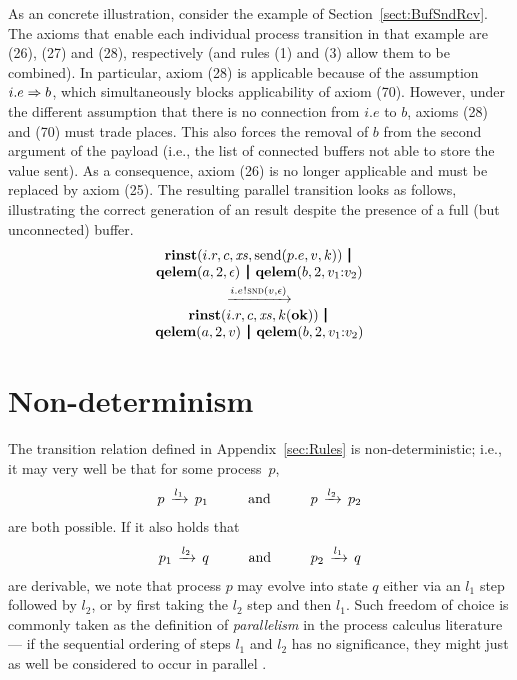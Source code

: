 \documentclass[10pt,conference]{IEEEtran}
\begin{document}
As an concrete illustration, consider the example of Section~\ref{sect:BufSndRcv}. The axioms that enable each individual process transition in that example are (26), (27) and (28), respectively (and rules (1) and (3) allow them to be combined). In particular, axiom (28) is applicable because of the assumption $i.e \Rightarrow b$, which simultaneously blocks applicability of axiom (70). However, under the different assumption that there is no connection from ${i.e}$ to $b$, axioms (28) and (70) must trade places. This also forces the removal of $b$ from the second argument of the  payload (i.e., the list of connected buffers not able to store the value sent). As a consequence, axiom (26) is no longer applicable and must be replaced by axiom (25). The resulting parallel transition looks as follows, illustrating the correct generation of an  result despite the presence of a full (but unconnected) buffer.
$$
\begin{array}{c}
  \Trinst {i.r} c \Xs {\TrteSend {p.e} v k} \,\Opar  \\
  {\Tqelem a 2 \Teps} \Opar {\Tqelem b 2 {\Tcons {v_1} {v_2}}} \vspace{0.6ex} \\
  \red{\say{i.e}{\Tsnd v \Teps}} \\
  \Trinst {i.r} c \Xs {\Tap k \Tok} \,\Opar \\
  {\Tqelem a 2 v} \Opar {\Tqelem b 2 {\Tcons {v_1} {v_2}}} \\
\end{array}
$$


\section{Non-determinism}
\label{sec:NonDet}

The transition relation defined in Appendix~\ref{sec:Rules} is non-deterministic; i.e., it may very well be that for some process~$p$,
$$
\begin{array}{c}
	p \red{l_1} p_1 \hspace{10mm}\text{and}\hspace{10mm} p \red{l_2} p_2
\end{array}
$$
are both possible. If it also holds that
$$
\begin{array}{c}
	p_1 \red{l_2} q \hspace{10mm}\text{and}\hspace{10mm} p_2 \red{l_1} q
\end{array}
$$
are derivable, we note that process $p$ may evolve into state $q$ either via an $l_1$ step followed by $l_2$, or by first taking the $l_2$ step and then $l_1$. Such freedom of choice is commonly taken as the definition of \emph{parallelism} in the process calculus literature --- if the sequential ordering of steps $l_1$ and $l_2$ has no significance, they might just as well be considered to occur in parallel \cite{milner:ComMob}.
\end{document}
